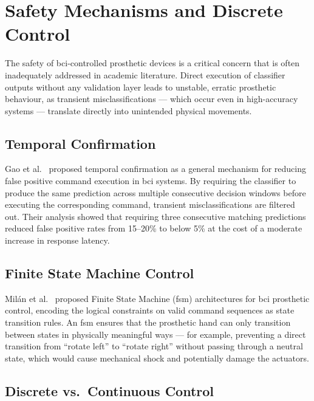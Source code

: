 \section{Safety Mechanisms and Discrete Control}
\label{sec:rw_safety}

The safety of \acrshort{bci}-controlled prosthetic devices is a
critical concern that is often inadequately addressed in academic
literature. Direct execution of classifier outputs without any
validation layer leads to unstable, erratic prosthetic behaviour,
as transient misclassifications — which occur even in high-accuracy
systems — translate directly into unintended physical movements.

\subsection{Temporal Confirmation}

Gao et al.~\cite{gao2021interface} proposed temporal confirmation
as a general mechanism for reducing false positive command execution
in \acrshort{bci} systems. By requiring the classifier to produce
the same prediction across multiple consecutive decision windows
before executing the corresponding command, transient
misclassifications are filtered out. Their analysis showed that
requiring three consecutive matching predictions reduced false
positive rates from 15--20\% to below 5\% at the cost of a moderate
increase in response latency.

\subsection{Finite State Machine Control}

Mil\'{a}n et al.~\cite{milan2010combining} proposed Finite State
Machine (\acrshort{fsm}) architectures for \acrshort{bci} prosthetic
control, encoding the logical constraints on valid command sequences
as state transition rules. An \acrshort{fsm} ensures that the
prosthetic hand can only transition between states in physically
meaningful ways — for example, preventing a direct transition from
``rotate left'' to ``rotate right'' without passing through a neutral
state, which would cause mechanical shock and potentially damage
the actuators.

\subsection{Discrete vs.\ Continuous Control}

